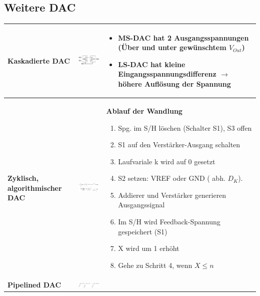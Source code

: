 \subsection{Weitere DAC}
\begin{longtable}{|>{\bfseries}p{4cm}|c|p{8cm}|}
	\hline
	Kaskadierte DAC
	& \includegraphics[width=5cm, valign=t]{./pictures/kaskadiertDAC.png}
	& \begin{itemize}
  		\item MS-DAC hat 2 Ausgangsspannungen (Über und unter gewünschtem
  			$V_{Out}$)
  		\item LS-DAC hat kleine Eingangsspannungsdifferenz $\to$ höhere Auflösung der Spannung
	  \end{itemize}
	\\ \hline
	Zyklisch, algorithmischer DAC \hartl{466}
	& \includegraphics[width=6cm, valign=t]{./pictures/zyklischDAC.png}
	& \textbf{Ablauf der Wandlung}
	  \begin{enumerate}
  		\item Spg. im S/H löschen (Schalter S1), S3 offen
  		\item S1 auf den Verstärker-Ausgang schalten
  		\item Laufvariale k wird auf 0 gesetzt
  		\item S2 setzen: VREF oder GND ( abh. $D_{K}$).
  		\item Addierer und Verstärker generieren Ausgangssignal
  		\item Im S/H wird Feedback-Spannung gespeichert (S1)
  		\item X wird um 1 erhöht
  		\item Gehe zu Schritt 4, wenn $X\leq n$
	  \end{enumerate}
	\\ \hline
	Pipelined DAC 
	& \includegraphics[width=6cm, valign=t]{pictures/piplinedDAC}

\end{longtable}

